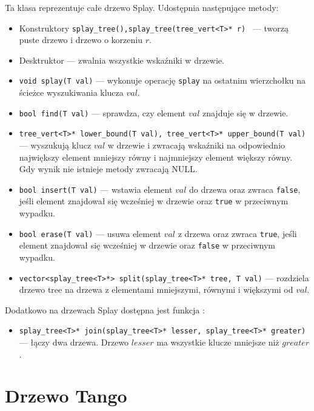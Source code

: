 \documentclass[declaration,shortabstract]{iithesis}
\theoremstyle{thm}
\theoremstyle{remark}
\theoremstyle{plain}
\theoremstyle{plain}
\theoremstyle{plain}
\begin{document}
Ta klasa reprezentuje całe drzewo Splay. Udostępnia następujące metody: 

\begin{itemize}

\item{Konstruktory \texttt{splay\_tree(),splay\_tree(tree\_vert<T>* r) } --- tworzą puste drzewo i drzewo o korzeniu $r$. }

\item{Desktruktor --- zwalnia wszystkie wskaźniki w drzewie.}

\item{\texttt{void splay(T val)} --- wykonuje operację \texttt{splay} na ostatnim wierzchołku na ścieżce wyszukiwania klucza $val$.}

\item{\texttt{bool find(T val)} --- sprawdza, czy element $val$ znajduje się w drzewie.}
    
\item{\texttt{tree\_vert<T>* lower\_bound(T val), tree\_vert<T>* upper\_bound(T val) } --- wyszukują klucz $val$ w drzewie i zwracają wskaźniki na odpowiednio największy element mniejszy równy i najmniejszy element większy równy. Gdy wynik nie istnieje metody zwracają NULL. }
   
\item{\texttt{bool insert(T val)} --- wstawia element $val$ do drzewa oraz zwraca \texttt{false}, jeśli element znajdował się wcześniej w drzewie oraz \texttt{true} w przeciwnym wypadku.}
\item{\texttt{bool erase(T val)} --- usuwa element $val$ z drzewa oraz zwraca \texttt{true}, jeśli element znajdował się wcześniej w drzewie oraz \texttt{false} w przeciwnym wypadku.}
\item{\texttt{vector<splay\_tree<T>*> split(splay\_tree<T>* tree, T val)} --- rozdziela drzewo tree na drzewa z elementami mniejszymi, równymi i większymi od $val$.}

\end{itemize}

Dodatkowo na drzewach Splay dostępna jest funkcja : 

\begin{itemize}
\item{\texttt{splay\_tree<T>* join(splay\_tree<T>* lesser, splay\_tree<T>* greater)} --- łączy dwa drzewa. Drzewo $lesser$ ma wszystkie klucze mniejsze niż $greater$.}

\end{itemize}

\chapter{ Drzewo Tango}
\end{document}
